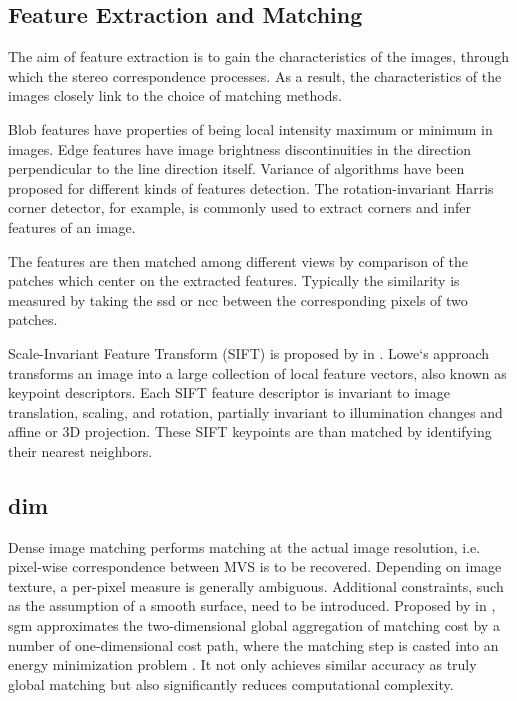 \subsection{Feature Extraction and Matching}
The aim of feature extraction is to gain the characteristics of the images, through which the stereo correspondence processes. As a result, the characteristics of the images closely link to the choice of matching methods. %

Blob features have properties of being local intensity maximum or minimum in images. Edge features have image brightness discontinuities in the direction perpendicular to the line direction itself. Variance of algorithms have been proposed for different kinds of features detection. The rotation-invariant Harris corner detector, for example, is commonly used to extract corners and infer features of an image. 

The features are then matched among different views by comparison of the patches which center on the extracted features. Typically the similarity is measured by taking the \gls{ssd} or \gls{ncc} between the corresponding pixels of two patches.%

Scale-Invariant Feature Transform (SIFT) is proposed by \citeauthor{LoweSep1999} in \citeyear{LoweSep1999} \cite{LoweSep1999}. Lowe‘s approach transforms an image into a large collection of local feature vectors, also known as keypoint descriptors. Each SIFT feature descriptor is invariant to image translation, scaling, and rotation, partially invariant to illumination changes and affine or 3D projection. These SIFT keypoints are than matched by identifying their nearest neighbors.


\subsection{\gls{dim}}
Dense image matching performs matching at the actual image resolution, i.e. pixel-wise correspondence between MVS is to be recovered. Depending on image texture, a per-pixel measure is generally ambiguous. Additional constraints, such as the assumption of a smooth surface, need to be introduced. Proposed by \citeauthor{Hirschmueller2008} in \citeyear{Hirschmueller2008}, \gls{sgm} approximates the two-dimensional global aggregation of matching cost by a number of one-dimensional cost path, where the matching step is casted into an energy minimization problem \cite{Hirschmueller2008}. It not only achieves similar accuracy as truly global matching but also significantly reduces computational complexity.

